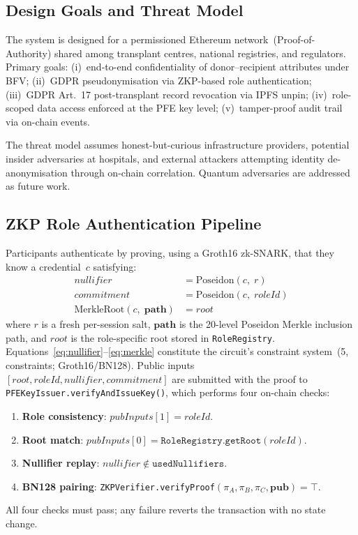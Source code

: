 \documentclass[10pt,twocolumn,a4paper]{article}
\begin{document}
\subsection{Design Goals and Threat Model}

The system is designed for a permissioned Ethereum network~(Proof-of-Authority) shared
among transplant centres, national registries, and regulators. Primary goals:
(i)~end-to-end confidentiality of donor--recipient attributes under BFV;
(ii)~GDPR pseudonymisation via ZKP-based role authentication;
(iii)~GDPR Art.~17 post-transplant record revocation via IPFS unpin;
(iv)~role-scoped data access enforced at the PFE key level;
(v)~tamper-proof audit trail via on-chain events.

The threat model assumes honest-but-curious infrastructure providers, potential
insider adversaries at hospitals, and external attackers attempting identity
de-anonymisation through on-chain correlation. Quantum adversaries are addressed
as future work.

\subsection{ZKP Role Authentication Pipeline}

Participants authenticate by proving, using a Groth16 zk-SNARK, that they know a
credential~$c$ satisfying:
\begin{align}
  \mathit{nullifier} &= \mathrm{Poseidon}(c,\; r) \label{eq:nullifier}\\
  \mathit{commitment} &= \mathrm{Poseidon}(c,\; \mathit{roleId}) \label{eq:commit}\\
  \mathrm{MerkleRoot}(c,\; \mathbf{path}) &= \mathit{root} \label{eq:merkle}
\end{align}
where $r$ is a fresh per-session salt, $\mathbf{path}$ is the 20-level Poseidon
Merkle inclusion path, and $\mathit{root}$ is the role-specific root stored in
\texttt{RoleRegistry}. Equations~\eqref{eq:nullifier}--\eqref{eq:merkle} constitute
the circuit's constraint system~(5, constraints; Groth16/BN128). Public
inputs~$[\mathit{root}, \mathit{roleId}, \mathit{nullifier}, \mathit{commitment}]$
are submitted with the proof to \texttt{PFEKeyIssuer.verifyAndIssueKey()}, which
performs four on-chain checks:
\begin{enumerate}[leftmargin=*, nosep]
  \item \textbf{Role consistency}: $\mathit{pubInputs}[1] = \mathit{roleId}$.
  \item \textbf{Root match}: $\mathit{pubInputs}[0] = \texttt{RoleRegistry.getRoot}(\mathit{roleId})$.
  \item \textbf{Nullifier replay}: $\mathit{nullifier} \notin \texttt{usedNullifiers}$.
  \item \textbf{BN128 pairing}: \texttt{ZKPVerifier.verifyProof}$(π_A,π_B,π_C,\mathbf{pub})=\top$.
\end{enumerate}
All four checks must pass; any failure reverts the transaction with no state change.
\end{document}
